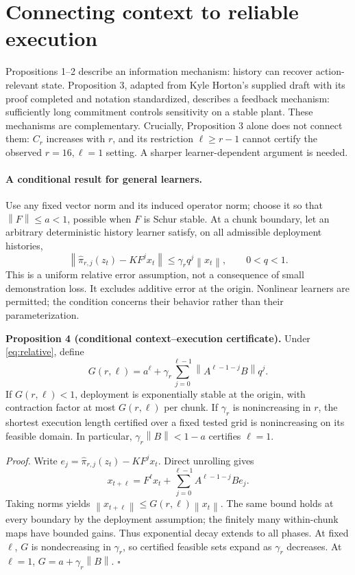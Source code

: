 \documentclass[11pt]{article}
\newcommand{\norm}[1]{\left\lVert#1\right\rVert}
\begin{document}
\section{Connecting context to reliable execution}
Propositions 1--2 describe an information mechanism: history can recover action-relevant state. Proposition 3, adapted from Kyle Horton's supplied draft with its proof completed and notation standardized, describes a feedback mechanism: sufficiently long commitment controls sensitivity on a stable plant. These mechanisms are complementary. Crucially, Proposition 3 alone does not connect them: $C_r$ increases with $r$, and its restriction $\ell\ge r-1$ cannot certify the observed $r=16,\ell=1$ setting. A sharper learner-dependent argument is needed.

\paragraph{A conditional result for general learners.}
Use any fixed vector norm and its induced operator norm; choose it so that $\norm{F}\le a<1$, possible when $F$ is Schur stable. At a chunk boundary, let an arbitrary deterministic history learner satisfy, on all admissible deployment histories,
\begin{equation}
\norm{\hat\pi_{r,j}(z_t)-KF^jx_t}\le\gamma_r q^j\norm{x_t},\qquad 0<q<1.
\label{eq:relative}
\end{equation}
This is a uniform relative error assumption, not a consequence of small demonstration loss. It excludes additive error at the origin. Nonlinear learners are permitted; the condition concerns their behavior rather than their parameterization.

\textbf{Proposition 4 (conditional context--execution certificate).} Under \eqref{eq:relative}, define
\begin{equation}
G(r,\ell)=a^\ell+\gamma_r\sum_{j=0}^{\ell-1}\norm{A^{\ell-1-j}B}q^j.
\label{eq:certificate}
\end{equation}
If $G(r,\ell)<1$, deployment is exponentially stable at the origin, with contraction factor at most $G(r,\ell)$ per chunk. If $\gamma_r$ is nonincreasing in $r$, the shortest execution length certified over a fixed tested grid is nonincreasing on its feasible domain. In particular, $\gamma_r\norm{B}<1-a$ certifies $\ell=1$.

\emph{Proof.} Write $e_j=\hat\pi_{r,j}(z_t)-KF^jx_t$. Direct unrolling gives
\[
x_{t+\ell}=F^\ell x_t+\sum_{j=0}^{\ell-1}A^{\ell-1-j}Be_j.
\]
Taking norms yields $\norm{x_{t+\ell}}\le G(r,\ell)\norm{x_t}$. The same bound holds at every boundary by the deployment assumption; the finitely many within-chunk maps have bounded gains. Thus exponential decay extends to all phases. At fixed $\ell$, $G$ is nondecreasing in $\gamma_r$, so certified feasible sets expand as $\gamma_r$ decreases. At $\ell=1$, $G=a+\gamma_r\norm{B}$. $\square$
\end{document}
